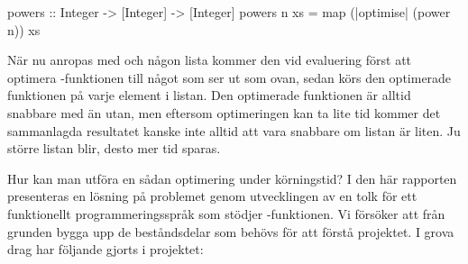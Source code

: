 \documentclass[Rapport]{subfiles}
\begin{document}
\begin{codeExDiff}
powers :: Integer -> [Integer] -> [Integer]
powers n xs = map (|optimise| (power n)) xs
\end{codeExDiff}

När nu  anropas med  och någon lista  kommer
den vid evaluering först att optimera -funktionen till något som 
ser ut som  ovan, sedan körs den optimerade funktionen på varje
element i listan. Den optimerade funktionen är alltid snabbare med 
än utan, men eftersom
optimeringen kan ta lite tid kommer det sammanlagda resultatet kanske inte alltid att vara
snabbare om listan  är liten. 
Ju större listan  blir, desto mer tid sparas.

Hur kan man utföra en sådan optimering under körningstid? I den här rapporten
presenteras en lösning på problemet genom utvecklingen av en tolk för ett
funktionellt programmeringsspråk som stödjer -funktionen. Vi försöker
att från grunden bygga upp de beståndsdelar som behövs för att förstå projektet.
I grova drag har följande gjorts i projektet:

\begin{comment}
Koens kommentar:
"Bidrag" separat


skriv lite mer om rapportens uppbyggnad
1. i rätt ordning
2. läsaren? vad menas med detta?
            bra fråga såklart... låt mig tänka
            vet inte men hur överblicken såg ut förut så var det referenser
            först till ektion 3, sen 2 sen 4 osv, han kanske tänkte sig
            en bit med stöd till läsaren också
            har nu flyttat om dem så att de är i ordning iaf
            gott!
            det blir bra
            jag tuggar vidare :D
            fast inte separerat bidrag och överblickish
            then fire z'missiles! men känns onaturligt
            jag håller egentligen med. det blir duplicering. hur ska det skrivas
            på ett naturligt sätt? vet inte riktigt. men ganska likt så som vi hade det fast i ordning och lite mer utvecklat
            tror jag inte blir helt fel
vill vi separera bidrag? ja
\end{comment}
\end{document}
